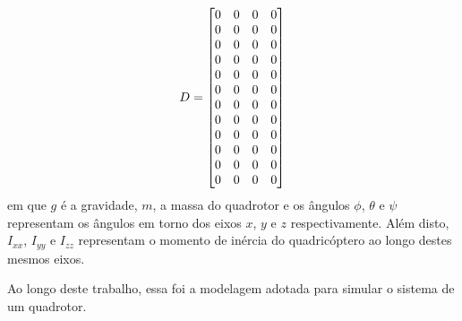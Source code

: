 \begin{equation*}
D =
\left[\begin{array}{@{}*{4}{c}@{}}
	0 & 0 & 0 & 0 \\
	0 & 0 & 0 & 0 \\
	0 & 0 & 0 & 0 \\
	0 & 0 & 0 & 0 \\
	0 & 0 & 0 & 0 \\
	0 & 0 & 0 & 0 \\
	0 & 0 & 0 & 0 \\
	0 & 0 & 0 & 0 \\
	0 & 0 & 0 & 0 \\
	0 & 0 & 0 & 0 \\
	0 & 0 & 0 & 0 \\
	0 & 0 & 0 & 0 \\
\end{array}\right]
\end{equation*}
em que $g$ é a gravidade, $m$, a massa do quadrotor e os ângulos $\phi$, $\theta$ e $\psi$ representam os ângulos em torno dos eixos $x$, $y$ e $z$ respectivamente. Além disto, $I_{xx}$, $I_{yy}$ e $I_{zz}$ representam o momento de inércia do quadricóptero ao longo destes mesmos eixos.

Ao longo deste trabalho, essa foi a modelagem adotada para simular o sistema de um quadrotor.